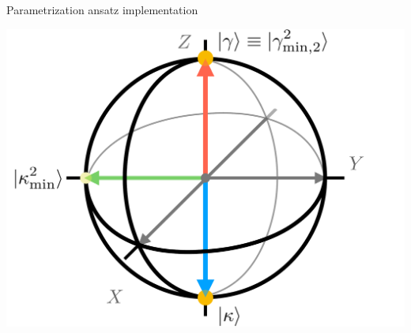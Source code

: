 \documentclass[9pt, handout, aspectratio=169]{beamer}	%
\begin{document}
\begin{frame}[allowframebreaks]{Parametrization ansatz implementation}
\begin{multicols}{2}
		\begin{center}
			\includegraphics[width=.4\paperwidth]{Figures/NJL1-model-solving/bloch-sphere}
		\end{center}

	\end{multicols}

\break


\end{frame}
\end{document}
